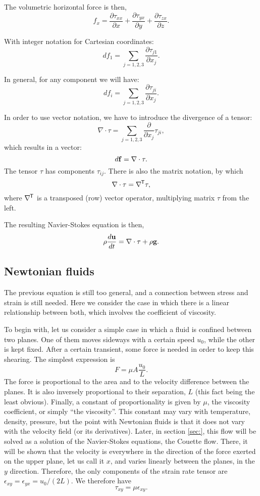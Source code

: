 The volumetric horizontal force is then,
\[
f_x  =
 \frac{\partial\tau_{xx}}{\partial x}
+\frac{\partial\tau_{yx}}{\partial y}
+\frac{\partial\tau_{zx}}{\partial z} .
\]

With integer notation for Cartesian coordinates:
\[
 df_1  =
 \sum_{j=1,2,3}
 \frac{\partial\tau_{j1}}{\partial x_j} .
\]


In general, for any component we will have:
\[
 df_i  =
 \sum_{j=1,2,3}
  \frac{\partial\tau_{ji}}{\partial x_j} .
\]

In order to use vector notation, we have to introduce the
divergence of a tensor:
\[
\nabla \cdot \tau = \sum_{j=1,2,3}
  \frac{\partial}{\partial x_j}  \tau_{ji} ,
\]
 which results in a vector:
\[
 d\mathbf{f}  =
 \nabla \cdot \tau .
\]
%
The tensor $\tau$ has components $\tau_{ij}$. There is also
the matrix notation, by which
\[
\nabla \cdot \tau = \nabla^{\mkern-1.5mu\mathsf{T}}  \tau ,
\]
where $\nabla^{\mkern-1.5mu\mathsf{T}}$ is a transposed (row) vector operator, multiplying
matrix $\tau$ from the left.

The resulting Navier-Stokes equation is then,
\[
\rho \frac{d\mathbf{u} }{dt} = \nabla \cdot \tau   + \rho \mathbf{g} .
\]



\subsection{Newtonian fluids}

The previous equation is still too general, and a connection between
stress and strain is still needed. Here we consider the case in which
there is a linear relationship between both, which involves the
coefficient of viscosity.

To begin with, let us consider a simple case in which a fluid is
confined between two planes. One of them moves sideways with a certain
speed $u_0$, while the other is kept fixed. After a certain transient,
some force is needed in order to keep this shearing. The simplest
expression is
\[
F= \mu A \frac{u_0}{L} .
\]
The force is proportional to the area and to the velocity difference
between the planes. It is also inversely proportional to their
separation, $L$ (this fact being the least obvious). Finally, a
constant of proportionality is given by $\mu$, the viscosity
coefficient, or simply ``the viscosity''. This constant may vary with
temperature, density, pressure, but the point with Newtonian fluids is
that it does not vary with the velocity field (or its
derivatives). Later, in section \ref{sec:}, this flow will be solved
as a solution of the Navier-Stokes equations, the Couette flow. There,
it will be shown that the velocity is everywhere in the direction of
the force exerted on the upper plane, let us call it $x$, and varies
linearly between the planes, in the $y$ direction. Therefore, the only
components of the strain rate tensor are $\epsilon_{xy} =
\epsilon_{yx} = u_0 / ( 2 L )$. We therefore have
\[
\tau_{xy} = \mu  \epsilon_{xy} .
\]

